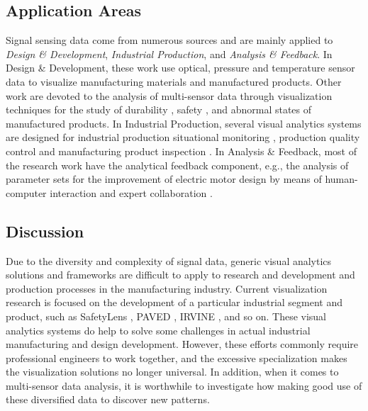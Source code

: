 \documentclass[a4paper,fleqn]{cas-dc}
\begin{document}
\subsection{Application Areas}
Signal sensing data come from numerous sources and are mainly applied to \textit{Design \& Development}, \textit{Industrial Production}, and \textit{Analysis \& Feedback}.
In Design \& Development, these work \cite{Huettenberger2015, Suzuki2020, Zappulla2019} use optical, pressure and temperature sensor data to visualize manufacturing materials and manufactured products. Other work are devoted to the analysis of multi-sensor data through visualization techniques for the study of durability \cite{zhao2019visual}, safety \cite{narechania2020safetylens}, and abnormal states \cite{eirich2021irvine} of manufactured products.
In Industrial Production, several visual analytics systems are designed for industrial production situational monitoring \cite{Zhou2018}, production quality control \cite{Huettenberger2015} and manufacturing product inspection \cite{eirich2021irvine}.
In Analysis \& Feedback, most of the research work have the analytical feedback component, e.g., the analysis of parameter sets for the improvement of electric motor design by means of human-computer interaction and expert collaboration \cite{cibulski2020paved}.


\subsection{Discussion}
Due to the diversity and complexity of signal data, generic visual analytics solutions and frameworks are difficult to apply to research and development and production processes in the manufacturing industry.
Current visualization research is focused on the development of a particular industrial segment and product, such as SafetyLens \cite{narechania2020safetylens}, PAVED \cite{cibulski2020paved}, IRVINE \cite{eirich2021irvine}, and so on. These visual analytics systems do help to solve some challenges in actual industrial manufacturing and design development. However, these efforts commonly require professional engineers to work together, and the excessive specialization makes the visualization solutions no longer universal. In addition, when it comes to multi-sensor data analysis, it is worthwhile to investigate how making good use of these diversified data to discover new patterns. 
\end{document}
